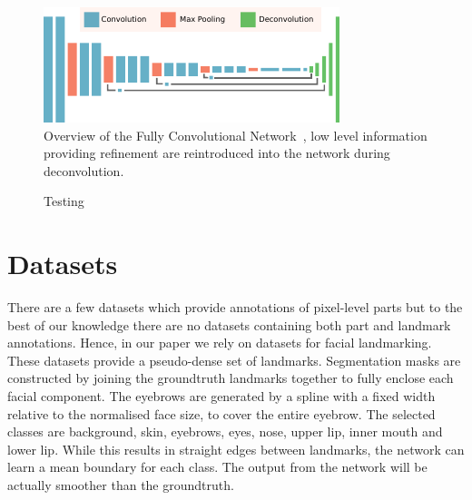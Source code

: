 \begin{figure}
\includegraphics[width=\linewidth]{figs/FCN.pdf}
\caption[VGG-16 Network]{Overview of the
  Fully Convolutional Network~\cite{long2015fully}, low level
  information providing refinement are reintroduced into the network
  during deconvolution.}
\label{fig:fcn}
\end{figure}

\begin{figure}
  \centering
  \caption[The VGG-16 network]{Testing}
\end{figure}

\section{Datasets}
\label{sec:dataset}

There are a few datasets which provide annotations of pixel-level
parts \cite{bo2011shape,kae2013augmenting,chen2014detect} but to the
best of our knowledge there are no datasets containing both part and
landmark annotations. Hence, in our paper we rely on datasets for
facial landmarking. These datasets provide a pseudo-dense set of
landmarks. Segmentation masks are constructed by joining the
groundtruth landmarks together to fully enclose each facial
component. The eyebrows are generated by a spline with a fixed width
relative to the normalised face size, to cover the entire eyebrow. The
selected classes are background, skin, eyebrows, eyes, nose, upper
lip, inner mouth and lower lip. While this results in straight edges
between landmarks, the network can learn a mean boundary for each
class. The output from the network will be actually smoother than the
groundtruth.

